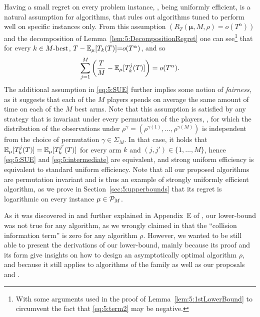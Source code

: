 Having a small regret on every problem instance, \ie, being uniformly efficient,
is a natural assumption for algorithms,
that rules out algorithms tuned to perform well on specific instances only.
%
From this assumption $\left(R_T(\boldsymbol{\mu},M,\rho)=o(T^\alpha)\right)$ and the decomposition of Lemma~\ref{lem:5:DecompositionRegret} one can see\footnote{With some arguments used in the proof of Lemma~\ref{lem:5:1stLowerBound} to circumvent the fact that \ref{eq:5:term2} may be negative.} that for every $k \in M\text{-}\mathrm{best}$,
${T}- \mathbb{E}_{\mu}[T_k(T)] {=} o(T^{\alpha})$, and so
\begin{equation}\label{eq:5:intermediate}
  \sum_{j =1}^M\left(\frac{T}{M} - \mathbb{E}_{\mu}[T^j_k(T)]\right) = o(T^{\alpha}).
\end{equation}
The additional assumption in \eqref{eq:5:SUE} further implies some notion of \emph{fairness}, as it suggests that each of the $M$ players spends on average the same amount of time on each of the $M$ best arms. Note that this assumption is satisfied by any strategy that is invariant under every permutation of the players, \ie, for which the distribution of the observations under $\rho^{\gamma} = (\rho^{\gamma(1)},\dots,\rho^{\gamma(M)})$ is independent from the choice of permutation $\gamma \in \Sigma_M$. In that case, it holds that  $\mathbb{E}_{\mu}[T_k^j(T)]=\mathbb{E}_{\mu}[T_k^{j'}(T)]$ for every arm $k$ and $(j,j') \in \{1,\dots,M\}$, hence \eqref{eq:5:SUE} and \eqref{eq:5:intermediate} are equivalent, and strong uniform efficiency is equivalent to standard uniform efficiency. Note that all our proposed algorithms are permutation invariant and \MCTopM{} is thus an example of strongly uniformly efficient algorithm, as we prove in Section~\ref{sec:5:upperbounds} that its regret is logarithmic on every instance $\mu \in \mathcal{P}_M$.

As it was discovered in \cite{BoursierPerchet18} and further explained in Appendix~E of \cite{KaufmannAbbas19}, our lower-bound was not true for any algorithm, as we wrongly claimed in \cite{Besson2018ALT} that the ``collision information term'' is zero for any algorithm $\rho$.
However, we wanted to be still able to present the derivations of our lower-bound, mainly because its proof and its form give insights on how to design an asymptotically optimal algorithm $\rho$, and because it still applies to algorithms of the \RhoRand{} family as well as our proposals \RandTopM{} and \MCTopM.

